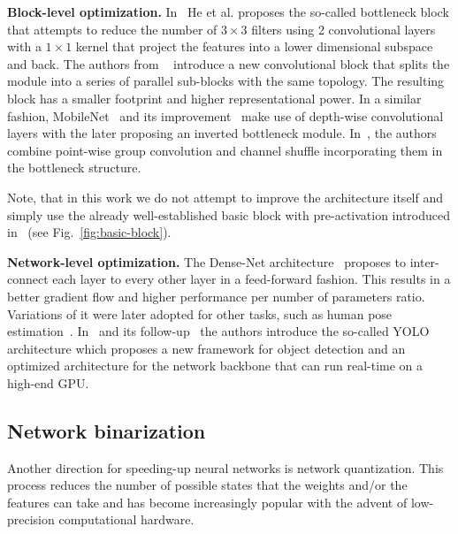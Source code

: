 \documentclass[10pt,twocolumn,letterpaper]{article}
\begin{document}
\textbf{Block-level optimization.} In~\cite{he2016deep} He et al. proposes the so-called bottleneck block that attempts to reduce the number of $3\times3$ filters using 2 convolutional layers with a $1\times1$ kernel that project the features into a lower dimensional subspace and back.  The authors from ~\cite{xie2016aggregated} introduce a new convolutional block that splits the module into a series of parallel sub-blocks with the same topology. The resulting block has a smaller footprint and higher representational power. In a similar fashion, MobileNet~\cite{howard2017mobilenets} and its improvement~\cite{sandler2018mobilenetv2} make use of depth-wise convolutional layers with the later proposing an inverted bottleneck module. In~\cite{zhang2018shufflenet}, the authors combine point-wise group convolution and channel shuffle incorporating them in the bottleneck structure.

Note, that in this work we do not attempt to improve the architecture itself and simply use the already well-established basic block with pre-activation introduced in~\cite{he2016identity} (see Fig.~\ref{fig:basic-block}).

\textbf{Network-level optimization.} The Dense-Net architecture~\cite{huang2016densely} proposes to inter-connect each layer to every other layer in a feed-forward fashion. This results in a better gradient flow and higher performance per number of parameters ratio. Variations of it were later adopted for other tasks, such as human pose estimation~\cite{tang2018quantized}. In~\cite{redmon2016you} and its follow-up~\cite{redmon2017yolo9000} the authors introduce the so-called YOLO architecture which proposes a new framework for object detection and an optimized architecture for the network backbone that can run real-time on a high-end GPU.

\subsection{Network binarization}\label{ssec:network-binarization}
Another direction for speeding-up neural networks is network quantization. This process reduces the number of possible states that the weights and/or the features can take and has become increasingly popular with the advent of low-precision computational hardware. 
\end{document}
